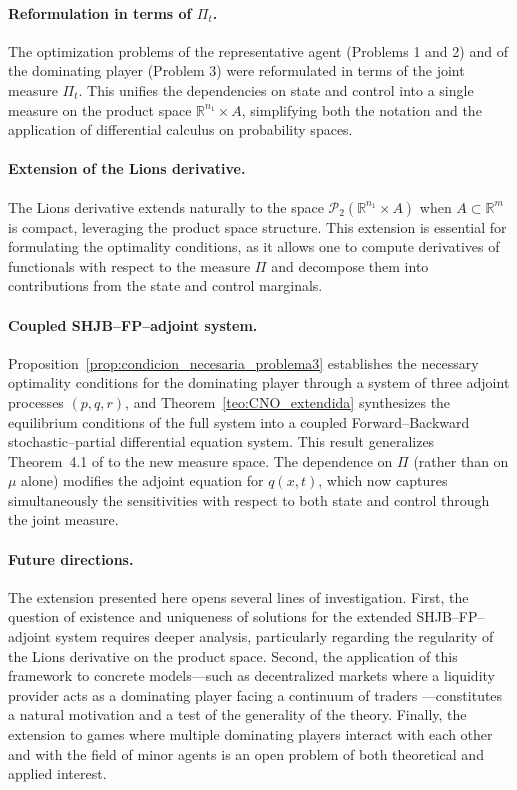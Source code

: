 \documentclass[12pt]{article}
\theoremstyle{definition}
\begin{document}
\paragraph{Reformulation in terms of $\Pi_t$.}
The optimization problems of the representative agent (Problems 1 and 2) and of the dominating player (Problem 3) were reformulated in terms of the joint measure $\Pi_t$. This unifies the dependencies on state and control into a single measure on the product space $\mathbb{R}^{n_1} \times A$, simplifying both the notation and the application of differential calculus on probability spaces.

\paragraph{Extension of the Lions derivative.}
The Lions derivative extends naturally to the space $\mathcal{P}_2(\mathbb{R}^{n_1} \times A)$ when $A \subset \mathbb{R}^m$ is compact, leveraging the product space structure. This extension is essential for formulating the optimality conditions, as it allows one to compute derivatives of functionals with respect to the measure $\Pi$ and decompose them into contributions from the state and control marginals.

\paragraph{Coupled SHJB--FP--adjoint system.}
Proposition~\ref{prop:condicion_necesaria_problema3} establishes the necessary optimality conditions for the dominating player through a system of three adjoint processes $(p, q, r)$, and Theorem~\ref{teo:CNO_extendida} synthesizes the equilibrium conditions of the full system into a coupled Forward--Backward stochastic--partial differential equation system. This result generalizes Theorem~4.1 of \cite{bensoussan2014mfgdominating} to the new measure space. The dependence on $\Pi$ (rather than on $\mu$ alone) modifies the adjoint equation for $q(x,t)$, which now captures simultaneously the sensitivities with respect to both state and control through the joint measure.

\paragraph{Future directions.}
The extension presented here opens several lines of investigation. First, the question of existence and uniqueness of solutions for the extended SHJB--FP--adjoint system requires deeper analysis, particularly regarding the regularity of the Lions derivative on the product space. Second, the application of this framework to concrete models---such as decentralized markets where a liquidity provider acts as a dominating player facing a continuum of traders \cite{munoz2025complexmarkets}---constitutes a natural motivation and a test of the generality of the theory. Finally, the extension to games where multiple dominating players interact with each other and with the field of minor agents is an open problem of both theoretical and applied interest.





\end{document}
